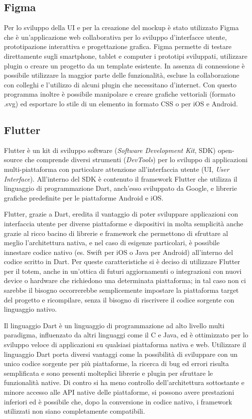 \subsection{Figma}
Per lo sviluppo della UI e per la creazione del mockup è stato utilizzato Figma \cite{figma} che è un'applicazione web collaborativa per lo sviluppo d'interfacce utente, prototipazione interattiva e progettazione grafica.
Figma permette di testare direttamente sugli smartphone, tablet e computer i prototipi sviluppati, utilizzare plugin o creare un progetto da un template esistente. In assenza di connessione è possibile utilizzare la maggior parte delle funzionalità, escluse la collaborazione con colleghi e l'utilizzo di alcuni plugin che necessitano d'internet.
 Con questo programma inoltre è possibile manipolare e creare grafiche vettoriali (formato .svg) ed esportare lo stile di un elemento in formato CSS o per iOS e Android.

\subsection{Flutter}
Flutter \cite{flutter} è un kit di sviluppo software (\textit{Software Development Kit}, SDK) open-source che comprende diversi strumenti (\textit{DevTools}) per lo sviluppo di applicazioni multi-piattaforma con particolare attenzione all'interfaccia utente (UI, \textit{User Interface}). All'interno del SDK è contenuto il framework Flutter che utilizza il linguaggio di programmazione Dart, anch'esso sviluppato da Google, e librerie grafiche predefinite per le piattaforme Android e iOS.

Flutter, grazie a Dart, eredita il vantaggio di poter sviluppare applicazioni con interfaccia utente per diverse piattaforme e dispositivi in molta semplicità anche grazie al ricco bacino di librerie e framework che permettono di sfruttare al meglio l'architettura nativa, e nel caso di esigenze particolari, è possibile innestare codice nativo (es. Swift per iOS o Java per Android) all'interno del codice scritto in Dart. Per queste caratteristiche si è deciso di utilizzare Flutter per il totem, anche in un'ottica di futuri aggiornamenti o integrazioni con nuovi device o hardware che richiedono una determinata piattaforma; in tal caso non ci sarebbe il bisogno occorrerebbe semplicemente impostare la piattaforma target del progetto e ricompilare, senza il bisogno di riscrivere il codice sorgente con linguaggio nativo.

Il linguaggio Dart è un linguaggio di programmazione ad alto livello multi paradigma, influenzato da altri linguaggi come il C e Java, ed è ottimizzato per lo sviluppo veloce di applicazioni su qualsiasi piattaforma nativa e web.
Utilizzare il linguaggio Dart porta diversi vantaggi come la possibilità di sviluppare con un unico codice sorgente per più piattaforme, la ricerca di bug ed errori risulta semplificata e sono presenti molteplici librerie e plugin per sfruttare le funzionalità native. Di contro si ha meno controllo dell'architettura sottostante e minore accesso alle API native delle piattaforme, si possono avere prestazioni inferiori ed è possibile che, dopo la conversione in codice nativo, i framework utilizzati non siano completamente compatibili.

